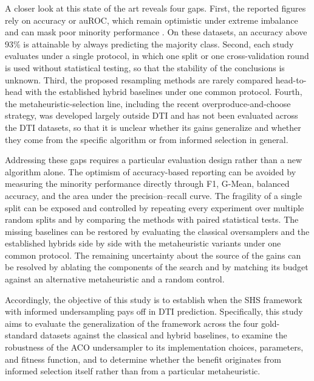 \documentclass[pdflatex,sn-basic]{sn-jnl}
\begin{document}
A closer look at this state of the art reveals four gaps. First, the
reported figures rely on accuracy or auROC, which remain optimistic
under extreme imbalance and can mask poor minority performance
\citep{saito2015precision}. On these datasets, an accuracy above 93\%
is attainable by always predicting the majority class. Second, each
study evaluates under a single protocol, in which one split or one
cross-validation round is used without statistical testing, so that the
stability of the conclusions is unknown. Third, the proposed resampling
methods are rarely compared head-to-head with the established hybrid
baselines under one common protocol. Fourth, the metaheuristic-selection
line, including the recent overproduce-and-choose strategy, was
developed largely outside DTI and has not been evaluated across the DTI
datasets, so that it is unclear whether its gains generalize and whether
they come from the specific algorithm or from informed selection in
general.

Addressing these gaps requires a particular evaluation design rather
than a new algorithm alone. The optimism of accuracy-based reporting can
be avoided by measuring the minority performance directly through F1,
G-Mean, balanced accuracy, and the area under the precision--recall
curve. The fragility of a single split can be exposed and controlled by
repeating every experiment over multiple random splits and by comparing
the methods with paired statistical tests. The missing baselines can be
restored by evaluating the classical oversamplers and the established
hybrids side by side with the metaheuristic variants under one common
protocol. The remaining uncertainty about the source of the gains can be
resolved by ablating the components of the search and by matching its
budget against an alternative metaheuristic and a random control.

Accordingly, the objective of this study is to establish when the SHS
framework with informed undersampling pays off in DTI prediction.
Specifically, this study aims to evaluate the generalization of the
framework across the four gold-standard datasets against the classical
and hybrid baselines, to examine the robustness of the ACO undersampler
to its implementation choices, parameters, and fitness function, and to
determine whether the benefit originates from informed selection itself
rather than from a particular metaheuristic.
\end{document}
